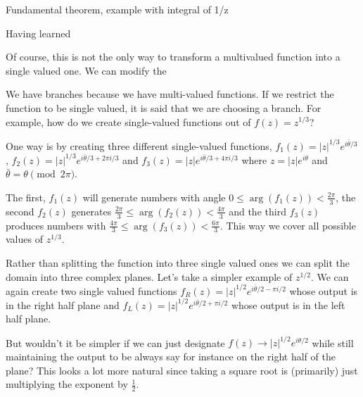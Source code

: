 \documentclass[aps,preprint,preprintnumbers,nofootinbib,showpacs,prd]{revtex4-1}
\begin{document}
Fundamental theorem, example with integral of 1/z








Having learned


















Of course, this is not the only way to transform a multivalued function into a single valued one. We can modify the 






















We have branches because we have multi-valued functions. If we restrict the function to be single valued, it is said that we are choosing a branch. For example, how do we create single-valued functions out of $f(z) = z^{1/3}$?

One way is by creating three different single-valued functions, $f_1(z) = |z|^{1/3}e^{i\bar\theta/3}$, $f_2(z) = |z|^{1/3} e^{i\bar\theta/3 + 2\pi i/3}$ and $f_3(z) = |z| e^{i\bar\theta/3 + 4\pi i / 3}$ where $z = |z| e^{i\theta}$ and $\bar\theta = \theta \pmod{2\pi}$. 

The first, $f_1(z)$ will generate numbers with angle $0 \le \arg (f_1(z)) < \tfrac{2\pi}{3}$, the second $f_2(z)$ generates $\tfrac{2\pi}{3} \le \arg (f_2(z)) < \tfrac{4\pi}{3}$ and the third $f_3(z)$ produces numbers with $\tfrac{4\pi}{3} \le \arg (f_3(z)) < \tfrac{6\pi}{3}$. This way we cover all possible values of $z^{1/3}$.

Rather than splitting the function into three single valued ones we can split the domain into three complex planes. Let's take a simpler example of $z^{1/2}$. We can again create two single valued functions $f_R(z) = |z|^{1/2} e^{i\bar\theta/2 -\pi i/2}$ whose output is in the right half plane and $f_L(z) = |z|^{1/2} e^{i\bar\theta/2 + \pi i/2}$ whose output is in the left half plane.

But wouldn't it be simpler if we can just designate $f(z) \to |z|^{1/2} e^{i\theta/2}$ while still maintaining the output to be always say for instance on the right half of the plane? This looks a lot more natural since taking a square root is (primarily) just multiplying the exponent by $\tfrac{1}{2}$.
\end{document}
